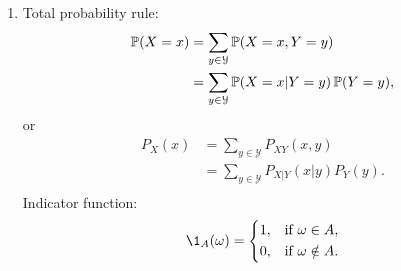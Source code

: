 \documentclass[a4paper]{article}
\begin{document}

\begin{enumerate}
  \setlength{\itemsep}{3\parskip}

    \item
    
    Total probability rule:
  \begin{equation*}
    \begin{aligned}
      \operatorname{\mathbb{P}}(X = x)
      &= \sum_{y \in \mathcal{Y}} \operatorname{\mathbb{P}}(X = x, Y = y)\\
      &= \sum_{y \in \mathcal{Y}} \operatorname{\mathbb{P}}(X = x| Y = y) \operatorname{\mathbb{P}}(Y = y),\\
    \end{aligned}
  \end{equation*}
  or
  \begin{equation*}
    \begin{aligned}
      P_{X}(x)
      &= \sum_{y \in \mathcal{Y}} P_{XY}(x,y)\\
      &= \sum_{y \in \mathcal{Y}} P_{X|Y}(x|y)P_{Y}(y).\\
    \end{aligned}
  \end{equation*}
  Indicator function:
  \begin{equation*}
    \1_A(\omega)=
    \left\{
    \begin{aligned}
      1, &\quad\text{if}~ \omega \in A,\\
      0, &\quad\text{if}~ \omega \notin A.
    \end{aligned}
    \right.
  \end{equation*}


\end{enumerate}
\end{document}
